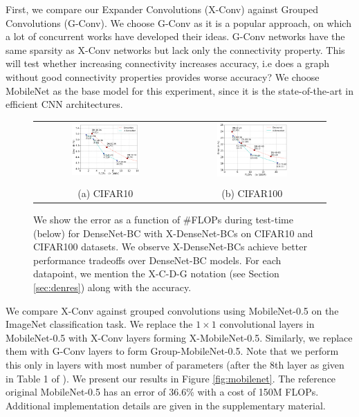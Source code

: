 \noindent First, we compare our Expander Convolutions (X-Conv) against Grouped Convolutions (G-Conv). We choose G-Conv as it is a popular approach, on which a lot of concurrent works \cite{zhang2018shufflenet} have developed their ideas. G-Conv networks have the same sparsity as X-Conv networks but lack only the connectivity property. This will test whether increasing connectivity increases accuracy, i.e does a graph without good connectivity properties provides worse accuracy? We choose MobileNet as the base model for this experiment, since it is the state-of-the-art in efficient CNN architectures.\\
\begin{figure}[t] 
\begin{tabular}{cc}
 \includegraphics[width=0.5\textwidth]{figures/cifar10flops.png}  & \includegraphics[width=0.5\textwidth] {figures/cifar100flops.png} \\
\\
(a) CIFAR10 & (b) CIFAR100 \\
\end{tabular}

\caption{We show the error as a function of \#FLOPs during test-time (below) for DenseNet-BC with X-DenseNet-BCs on CIFAR10 and CIFAR100 datasets. We observe X-DenseNet-BCs achieve better performance tradeoffs over DenseNet-BC models. For each datapoint, we mention the X-C-D-G notation (see Section \ref{sec:denres}) along with the accuracy.
}

\label{fig:cifar}
\end{figure}
\noindent We compare X-Conv against grouped convolutions using MobileNet-0.5 on the ImageNet classification task. We replace the $1\times 1$ convolutional layers in MobileNet-0.5 with X-Conv layers forming X-MobileNet-0.5. Similarly, we replace them with G-Conv layers to form Group-MobileNet-0.5. Note that we perform this only in layers with most number of parameters (after the 8th layer as given in Table 1 of \cite{howard2017mobilenets}). We present our results in Figure \ref{fig:mobilenet}. The reference original MobileNet-0.5 has an error of 36.6\% with a cost of 150M FLOPs. Additional implementation details are given in the supplementary material.\\

